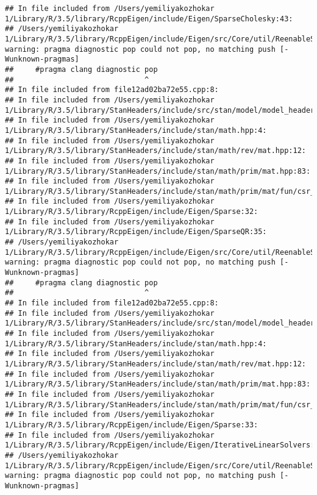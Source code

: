\documentclass[]{article}
\begin{document}
\begin{verbatim}
## In file included from /Users/yemiliyakozhokar 1/Library/R/3.5/library/RcppEigen/include/Eigen/SparseCholesky:43:
## /Users/yemiliyakozhokar 1/Library/R/3.5/library/RcppEigen/include/Eigen/src/Core/util/ReenableStupidWarnings.h:10:30: warning: pragma diagnostic pop could not pop, no matching push [-Wunknown-pragmas]
##     #pragma clang diagnostic pop
##                              ^
## In file included from file12ad02ba72e55.cpp:8:
## In file included from /Users/yemiliyakozhokar 1/Library/R/3.5/library/StanHeaders/include/src/stan/model/model_header.hpp:4:
## In file included from /Users/yemiliyakozhokar 1/Library/R/3.5/library/StanHeaders/include/stan/math.hpp:4:
## In file included from /Users/yemiliyakozhokar 1/Library/R/3.5/library/StanHeaders/include/stan/math/rev/mat.hpp:12:
## In file included from /Users/yemiliyakozhokar 1/Library/R/3.5/library/StanHeaders/include/stan/math/prim/mat.hpp:83:
## In file included from /Users/yemiliyakozhokar 1/Library/R/3.5/library/StanHeaders/include/stan/math/prim/mat/fun/csr_extract_u.hpp:6:
## In file included from /Users/yemiliyakozhokar 1/Library/R/3.5/library/RcppEigen/include/Eigen/Sparse:32:
## In file included from /Users/yemiliyakozhokar 1/Library/R/3.5/library/RcppEigen/include/Eigen/SparseQR:35:
## /Users/yemiliyakozhokar 1/Library/R/3.5/library/RcppEigen/include/Eigen/src/Core/util/ReenableStupidWarnings.h:10:30: warning: pragma diagnostic pop could not pop, no matching push [-Wunknown-pragmas]
##     #pragma clang diagnostic pop
##                              ^
## In file included from file12ad02ba72e55.cpp:8:
## In file included from /Users/yemiliyakozhokar 1/Library/R/3.5/library/StanHeaders/include/src/stan/model/model_header.hpp:4:
## In file included from /Users/yemiliyakozhokar 1/Library/R/3.5/library/StanHeaders/include/stan/math.hpp:4:
## In file included from /Users/yemiliyakozhokar 1/Library/R/3.5/library/StanHeaders/include/stan/math/rev/mat.hpp:12:
## In file included from /Users/yemiliyakozhokar 1/Library/R/3.5/library/StanHeaders/include/stan/math/prim/mat.hpp:83:
## In file included from /Users/yemiliyakozhokar 1/Library/R/3.5/library/StanHeaders/include/stan/math/prim/mat/fun/csr_extract_u.hpp:6:
## In file included from /Users/yemiliyakozhokar 1/Library/R/3.5/library/RcppEigen/include/Eigen/Sparse:33:
## In file included from /Users/yemiliyakozhokar 1/Library/R/3.5/library/RcppEigen/include/Eigen/IterativeLinearSolvers:46:
## /Users/yemiliyakozhokar 1/Library/R/3.5/library/RcppEigen/include/Eigen/src/Core/util/ReenableStupidWarnings.h:10:30: warning: pragma diagnostic pop could not pop, no matching push [-Wunknown-pragmas]

\end{verbatim}
\end{document}
